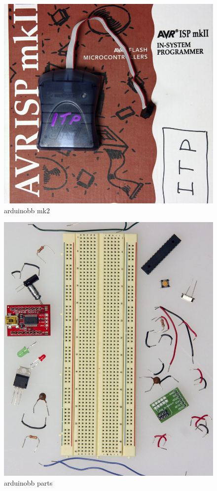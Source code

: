 \begin{figure}[!htb]
 \centering
 \includegraphics[scale=0.3]{img/arduino_breadboard/arduinobb_mk2.jpg}
 \caption{arduinobb mk2}
 \label{arduinobb mk2}
\end{figure}


\begin{figure}[!htb]
 \centering
 \includegraphics[scale=0.3]{img/arduino_breadboard/arduinobb_parts.jpg}
 \caption{arduinobb parts}
 \label{arduinobb parts}
\end{figure}


